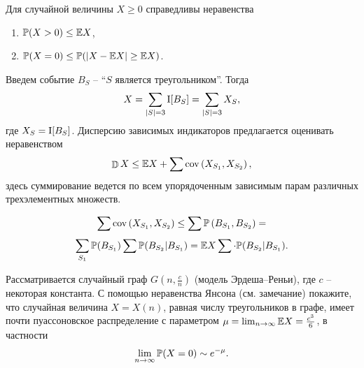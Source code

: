 \begin{ordre}

Для случайной величины $X \geq 0$ справедливы неравенства 

\begin{enumerate}

\item $\mathrm{{\mathbb P}}( X>0) \le \mathrm{{\mathbb E}} X$, 

\item $\mathrm{{\mathbb P}}( X=0) \le \mathrm{{\mathbb P}}( |X- \mathrm{{\mathbb E}} X|\ge \mathrm{{\mathbb E}} X)$. 

\end{enumerate}

\noindent Введем событие $B_{S}$ -- ``$S$ является треугольником''. Тогда 
\[
X=\sum _{|S|=3} \mathrm{I} [B_{S}] = \sum _{|S|=3} X_S,
\]
где $ X_S = \mathrm{I} [B_{S}]$.
Дисперсию зависимых индикаторов предлагается оценивать неравенством  
\[
\mathop{\mathbb{D}}\nolimits X\leq  \mathrm{{\mathbb E}} X+\sum \mathrm{cov}\left( X_{S_1} , X_{S_2} \right), 
\] 
здесь суммирование ведется по всем упорядоченным зависимым парам различных трехэлементных множеств. 

\[
\sum \mathrm{cov}\left( X_{S_1} , X_{S_2} \right) \leq \sum \mathrm{{\mathbb P}} \left( B_{S_1} , B_{S_2} \right)  =
\]\[
\sum _{S_1} \mathrm{{\mathbb P}} ( B_{S_1} )  \sum  \mathrm{{\mathbb P}} (B_{S_2} | B_{S_1} )  = \mathrm{{\mathbb E}} X\sum _{} \cdot \mathrm{{\mathbb P}} (B_{S_2} | B_{S_1} ).
\] 


\end{ordre}

\begin{problem}  
Рассматривается случайный граф $G\left(n,\frac{c}{n} \right)$ (модель Эрдеша--Реньи), где $c$ -- некоторая константа. С помощью неравенства Янсона (см. замечание) покажите, что случайная величина $X = X(n)$, равная числу треугольников в графе, имеет почти пуассоновское распределение с параметром $\mu=\lim_{n\to\infty}\mathrm{{\mathbb E}} X = \frac{c^3}{6}$, в частности 
\[ 
\lim_{n\to\infty}\mathrm{{\mathbb P}} (X=0) \sim e^{ - \mu} .
\]

\end{problem}

